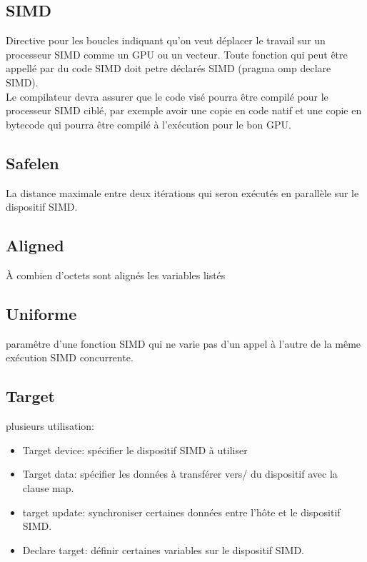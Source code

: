 \documentclass[oneside]{book}
\begin{document}
\subsection{SIMD}
Directive pour les boucles indiquant qu'on veut déplacer le travail sur un processeur SIMD comme un GPU ou un vecteur. Toute fonction qui peut être appellé par du code SIMD doit petre déclarés SIMD (pragma omp declare SIMD). \\

Le compilateur devra assurer que le code visé pourra être compilé pour le processeur SIMD ciblé, par exemple avoir une copie en code natif et une copie en bytecode qui pourra être compilé à l'exécution pour le bon GPU.
\subsection{Safelen}
La distance maximale entre deux itérations qui seron exécutés en parallèle sur le dispositif SIMD.
\subsection{Aligned}
À combien d'octets sont alignés les variables listés
\subsection{Uniforme}
paramêtre d'une fonction SIMD qui ne varie pas d'un appel à l'autre de la même exécution SIMD concurrente.
\subsection{Target}
plusieurs utilisation:
\begin{itemize}
\item Target device: spécifier le dispositif SIMD à utiliser
\item Target data: spécifier les données à transférer vers/ du dispositif avec la clause map.
\item target update: synchroniser certaines données entre l'hôte et le dispositif SIMD.
\item Declare target: définir certaines variables sur le dispositif SIMD.
\end{itemize}
\end{document}
